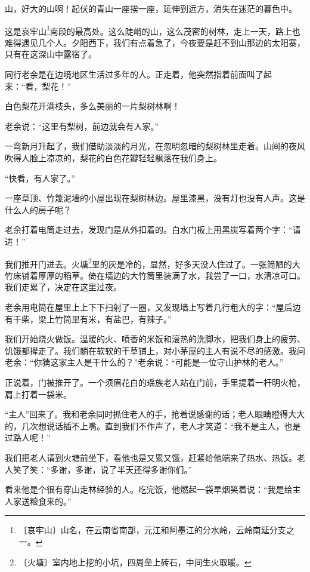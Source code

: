 \documentclass[12pt,UTF-8,openany]{ctexbook}
\begin{document}
\begin{normalsize}
    
    山，好大的山啊！起伏的青山一座挨一座，延伸到远方，消失在迷茫的暮色中。
    
    这是哀牢山\footnote{〔哀牢山〕山名，在云南省南部，元江和阿墨江的分水岭，云岭南延分支之一。}南段的最高处。这么陡峭的山，这么茂密的树林，走上一天，路上也难得遇见几个人。夕阳西下，我们有点着急了，今夜要是赶不到山那边的太阳寨，只有在这深山中露宿了。
    
    同行老余是在边境地区生活过多年的人。正走着，他突然指着前面叫了起来：“看，梨花！”
    
    白色梨花开满枝头，多么美丽的一片梨树林啊！
    
    老余说：“这里有梨树，前边就会有人家。”
    
    一弯新月升起了，我们借助淡淡的月光，在忽明忽暗的梨树林里走着。山间的夜风吹得人脸上凉凉的，梨花的白色花瓣轻轻飘落在我们身上。
    
    “快看，有人家了。”
    
    一座草顶、竹篾泥墙的小屋出现在梨树林边。屋里漆黑，没有灯也没有人声。这是什么人的房子呢？
    
    老余打着电筒走过去，发现门是从外扣着的。白水门板上用黑炭写着两个字：“请进！”
    
    我们推开门进去。火塘\footnote{〔火塘〕室内地上挖的小坑，四周垒上砖石，中间生火取暖。}里的灰是冷的，显然，好多天没人住过了。一张简陋的大竹床铺着厚厚的稻草。倚在墙边的大竹筒里装满了水，我尝了一口，水清凉可口。我们走累了，决定在这里过夜。
    
    老余用电筒在屋里上上下下扫射了一圈，又发现墙上写着几行粗大的字：“屋后边有干柴，梁上竹筒里有米，有盐巴，有辣子。”
    
    我们开始烧火做饭。温暖的火、喷香的米饭和滚热的洗脚水，把我们身上的疲劳、饥饿都撵走了。我们躺在软软的干草铺上，对小茅屋的主人有说不尽的感激。我问老余：“你猜这家主人是干什么的？”老余说：“可能是一位守山护林的老人。”
    
    正说着，门被推开了。一个须眉花白的瑶族老人站在门前，手里提着一杆明火枪，肩上打着一袋米。
    
    “主人”回来了。我和老余同时抓住老人的手，抢着说感谢的话；老人眼睛瞪得大大的，几次想说话插不上嘴。直到我们不作声了，老人才笑道：“我不是主人，也是过路人呢！”
    
    我们把老人请到火塘前坐下，看他也是又累又饿，赶紧给他端来了热水、热饭。老人笑了笑：“多谢，多谢，说了半天还得多谢你们。”
    
    看来他是个很有穿山走林经验的人。吃完饭，他燃起一袋旱烟笑着说：“我是给主人家送粮食来的。”
    

\end{normalsize}
\end{document}
